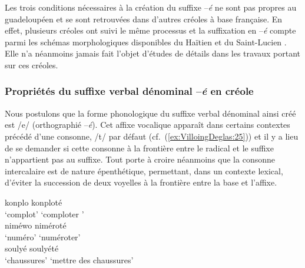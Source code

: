 \documentclass[output=paper]{langsci/langscibook}
\begin{document}
Les trois conditions nécessaires à la création du suffixe --\emph{é} ne
sont pas propres au guadeloupéen et se sont retrouvées dans d'autres
créoles à base française. En effet, plusieurs créoles ont suivi le même
processus et la suffixation en --\emph{é} compte parmi les schémas
morphologiques disponibles du Haïtien %
\citep{DeGraff2001,Lefebvre98,Lefebvre2003} %
%
et du Saint-Lucien %
\citep{Bhatt00,Brousseau11}%
%
. Elle
n'a néanmoins jamais fait l'objet d'études de détails dans les travaux
portant sur ces créoles.

\subsubsection{\texorpdfstring{Propriétés du suffixe verbal dénominal
--\emph{é }en
créole}{Propriétés du suffixe verbal dénominal --é en créole}}\label{propriétés-du-suffixe-verbal-dénominal-é-en-créole}

\label{forme-phonologique-du-suffixe}

Nous postulons que la forme phonologique du suffixe verbal dénominal
ainsi créé est /e/ (orthographié --\emph{é}). Cet affixe vocalique
apparaît dans certains contextes précédé d'une consonne, /t/ par défaut
(cf.~(\ref{ex:VilloingDeglas:25})) et il y a lieu de se demander si cette consonne à la frontière
entre le radical et le suffixe n'appartient pas au suffixe. Tout porte à
croire néanmoins que la consonne intercalaire est de nature
épenthétique, permettant, dans un contexte lexical, d'éviter la
succession de deux voyelles à la frontière entre la base et l'affixe.

\ea \label{ex:VilloingDeglas:25}
  \ea \gll konplo 	\textrightarrow{~} konploté\\
  {`complot'} {} {`comploter '}\\
  \ex \gll niméwo 	\textrightarrow{~} niméroté\\
  {`numéro'} {} {`numéroter'}\\
  \ex \gll soulyé 	\textrightarrow{~} soulyété\\
  {`chaussures'} {} {`mettre des chaussures'}\\
\z\z
\end{document}
